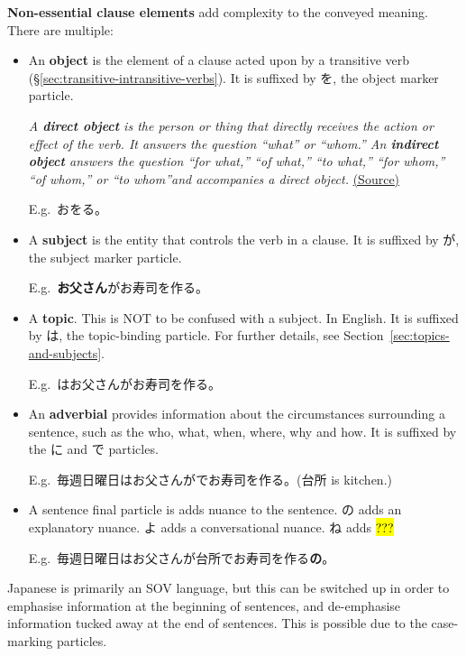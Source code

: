 \documentclass[../nihongo-gakushuu-kyouzai.tex]{subfiles}
\begin{document}
\textbf{Non-essential clause elements} add complexity to the conveyed meaning. There are multiple:
\begin{itemize}
    \item An \textbf{object} is the element of a clause acted upon by a transitive verb (\S\ref{sec:transitive-intransitive-verbs}). It is suffixed by を, the object marker particle.

    \emph{A \textbf{direct object} is the person or thing that directly receives the action or effect of the verb. It answers the question ``what'' or ``whom.'' An \textbf{indirect object} answers the question ``for what,'' ``of what,'' ``to what,'' ``for whom,'' ``of whom,'' or ``to whom''and accompanies a direct object.} \href{https://www.britannica.com/dictionary/eb/qa/Direct-and-Indirect-Objects}{(Source)}

    E.g.\ お\textbf{}をる。
    \item A \textbf{subject} is the entity that controls the verb in a clause. It is suffixed by が, the subject marker particle.

    E.g.\ \textbf{お父さん}がお寿司を作る。
    \item A \textbf{topic}. This is NOT to be confused with a subject. In English. It is suffixed by は, the topic-binding particle. For further details, see Section~\ref{sec:topics-and-subjects}.

    E.g.\ \textbf{}はお父さんがお寿司を作る。
    \item An \textbf{adverbial} provides information about the circumstances surrounding a sentence, such as the who, what, when, where, why and how. It is suffixed by the に and で particles.

    E.g.\ 毎週日曜日はお父さんが\textbf{}でお寿司を作る。(台所 is kitchen.)

    \item A sentence final particle is adds nuance to the sentence. の adds an explanatory nuance. よ adds a conversational nuance. ね adds \hl{???}

    E.g.\ 毎週日曜日はお父さんが台所でお寿司を作る\textbf{の}。
\end{itemize}

Japanese is primarily an SOV language, but this can be switched up in order to emphasise information at the beginning of sentences, and de-emphasise information tucked away at the end of sentences. This is possible due to the case-marking particles.
\end{document}
